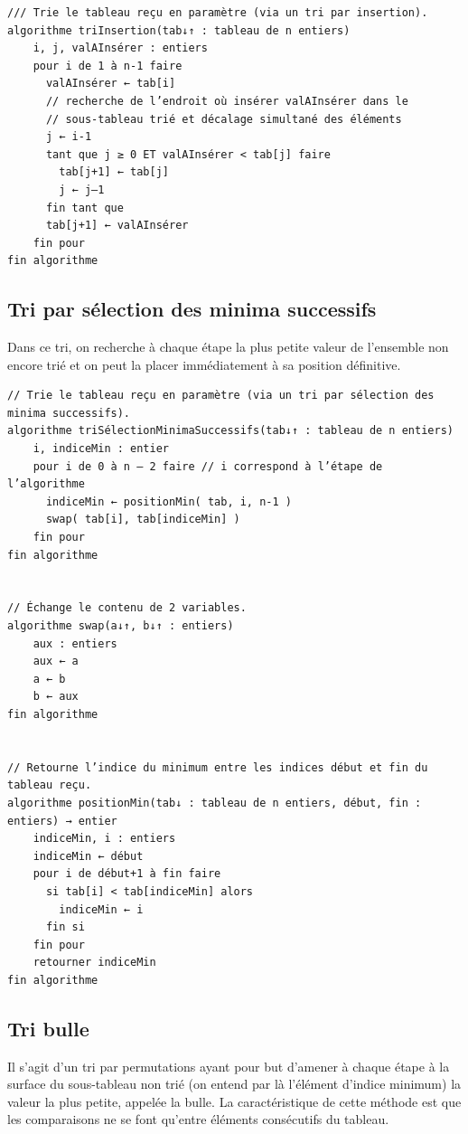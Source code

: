 \documentclass[11pt,a4paper]{article}
\begin{document}
            \par
        \begin{verbatim}
/// Trie le tableau reçu en paramètre (via un tri par insertion).
algorithme triInsertion(tab↓↑ : tableau de n entiers)
    i, j, valAInsérer : entiers
    pour i de 1 à n-1 faire
      valAInsérer ← tab[i]
      // recherche de l’endroit où insérer valAInsérer dans le
      // sous-tableau trié et décalage simultané des éléments
      j ← i-1
      tant que j ≥ 0 ET valAInsérer < tab[j] faire
        tab[j+1] ← tab[j]
        j ← j–1
      fin tant que
      tab[j+1] ← valAInsérer
    fin pour
fin algorithme
\end{verbatim}\subsection{Tri par s\'election des minima successifs}
		    Dans ce tri, on recherche \`a chaque \'etape la plus petite valeur de l'ensemble non encore tri\'e
        et on peut la placer imm\'ediatement \`a sa position d\'efinitive.
      
            \par
        \begin{verbatim}
// Trie le tableau reçu en paramètre (via un tri par sélection des minima successifs).
algorithme triSélectionMinimaSuccessifs(tab↓↑ : tableau de n entiers)
    i, indiceMin : entier
    pour i de 0 à n – 2 faire // i correspond à l’étape de l’algorithme
      indiceMin ← positionMin( tab, i, n-1 )
      swap( tab[i], tab[indiceMin] )
    fin pour
fin algorithme


// Échange le contenu de 2 variables.
algorithme swap(a↓↑, b↓↑ : entiers)
    aux : entiers
    aux ← a
    a ← b
    b ← aux
fin algorithme


// Retourne l’indice du minimum entre les indices début et fin du tableau reçu.
algorithme positionMin(tab↓ : tableau de n entiers, début, fin : entiers) → entier
    indiceMin, i : entiers
    indiceMin ← début
    pour i de début+1 à fin faire
      si tab[i] < tab[indiceMin] alors
        indiceMin ← i
      fin si
    fin pour
    retourner indiceMin
fin algorithme

      \end{verbatim}\subsection{Tri bulle}
		    Il s'agit d'un tri par permutations ayant pour but d'amener \`a chaque \'etape \`a la \guillemotleft  surface \guillemotright 
        du sous-tableau non tri\'e (on entend par l\`a l'\'el\'ement d'indice minimum) la valeur la plus
        petite, appel\'ee la bulle. La caract\'eristique de cette m\'ethode est que les comparaisons ne se
        font qu'entre \'el\'ements cons\'ecutifs du tableau.
		  
\end{document}
